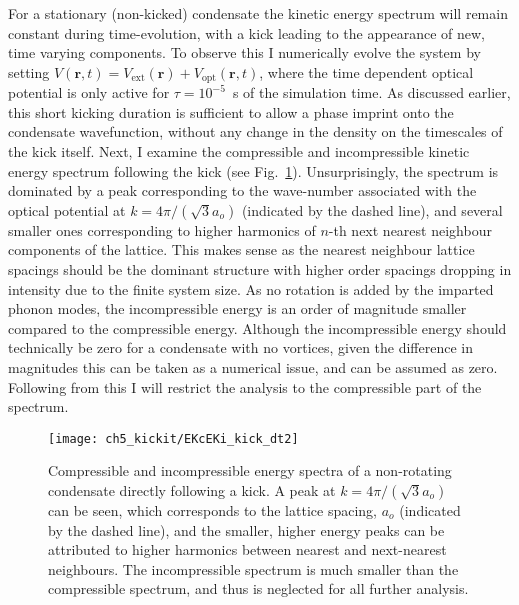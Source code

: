 For a stationary (non-kicked) condensate the kinetic energy spectrum will remain constant during time-evolution, with a kick leading to the appearance of new, time varying components. To observe this I numerically evolve the system by setting $V(\mathbf{r},t) = V_{\text{ext}}(\mathbf{r}) + V_{\text{opt}}(\mathbf{r},t)$, where the time dependent optical potential is only active for $\tau=10^{-5}$~s of the simulation time. As discussed earlier, this short kicking duration is sufficient to allow a phase imprint onto the condensate wavefunction, without any change in the density on the timescales of the kick itself. Next, I examine the compressible and incompressible kinetic energy spectrum following the kick (see Fig.~\ref{fig:ekc_eki_novtx}). Unsurprisingly, the spectrum is dominated by a peak corresponding to the wave-number associated with the optical potential at $k=4\pi/(\sqrt{3}a_o)$ (indicated by the dashed line), and several smaller ones corresponding to higher harmonics of $n$-th next nearest neighbour components of the lattice. This makes sense as the nearest neighbour lattice spacings should be the dominant structure with higher order spacings dropping in intensity due to the finite system size. As no rotation is added by the imparted phonon modes, the incompressible energy is an order of magnitude smaller compared to the compressible energy. Although the incompressible energy should technically be zero for a condensate with no vortices, given the difference in magnitudes this can be taken as a numerical issue, and can be assumed as zero. Following from this I will restrict the analysis to the compressible part of the spectrum.

\begin{figure}
    \centering
    \texttt{[image: ch5\_kickit/EKcEKi\_kick\_dt2]}
    \caption[Compressible and incompressible energy spectra of a non-rotating condensate directly following a kick.]{Compressible and incompressible energy spectra of a non-rotating condensate directly following a kick. A peak at $k=4\pi/(\sqrt{3}a_o)$ can be seen, which corresponds to the lattice spacing, $a_o$ (indicated by the dashed line), and the smaller, higher energy peaks can be attributed to higher harmonics between nearest and next-nearest neighbours. The incompressible spectrum is much smaller than the compressible spectrum, and thus is neglected for all further analysis.}
    \label{fig:ekc_eki_novtx}
\end{figure}


